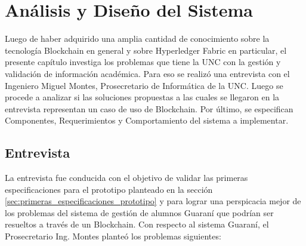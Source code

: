 
\chapter{Análisis y Diseño del Sistema} %

\label{Chapter4} %


Luego de haber adquirido una amplia cantidad de conocimiento sobre la tecnología Blockchain en general y sobre Hyperledger Fabric en particular, el presente capítulo investiga los problemas que tiene la UNC con la gestión y validación de información académica. Para eso se realizó una entrevista con el Ingeniero Miguel Montes, Prosecretario de Informática de la UNC. Luego se procede a analizar si las soluciones propuestas a las cuales se llegaron en la entrevista representan un caso de uso de Blockchain. Por último, se especifican Componentes, Requerimientos y Comportamiento del sistema a implementar.

\section{Entrevista}
La entrevista fue conducida con el objetivo de validar las primeras especificaciones para el prototipo planteado en la sección \ref{sec:primeras_especificaciones_prototipo} y para lograr una perspicacia mejor de los problemas del sistema de gestión de alumnos Guaraní que podrían ser resueltos a través de un Blockchain.
Con respecto al sistema Guaraní, el Prosecretario Ing. Montes planteó los problemas siguientes:

